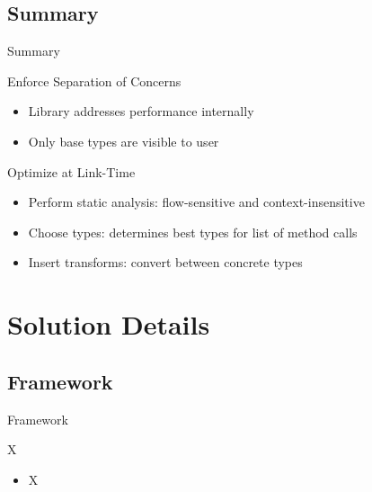 \documentclass{beamer}
\begin{document}
\subsection{Summary}
\begin{frame}{Summary}
  \begin{block}{Enforce Separation of Concerns}
    \begin{itemize}
    \item Library addresses performance internally
    \item Only base types are visible to user
    \end{itemize}
  \end{block}
\pause
  \begin{block}{Optimize at Link-Time}
    \begin{itemize}
    \item Perform static analysis: flow-sensitive and context-insensitive
    \item Choose types: determines best types for list of method calls
    \item Insert transforms: convert between concrete types
    \end{itemize}
  \end{block}
\end{frame}

\section{Solution Details}

\subsection{Framework} %
\begin{frame}{Framework}
  \begin{block}{X}
    \begin{itemize}
    \item X
    \end{itemize}
  \end{block}
\end{frame}
\end{document}
